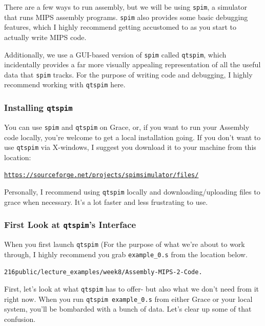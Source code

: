 \documentclass[english, 10pt]{article}
\begin{document}
There are a few ways to run assembly, but we will be using \texttt{spim}, a simulator that runs MIPS assembly programs. \texttt{spim} also provides some basic debugging features, which I highly recommend getting accustomed to as you start to actually write MIPS code.\newline

Additionally, we use a GUI-based version of \texttt{spim} called \texttt{qtspim}, which incidentally provides a far more visually appealing representation of all the useful data that \texttt{spim} tracks. For the purpose of writing code and debugging, I highly recommend working with \texttt{qtspim} here.\newline

\subsubsection{Installing \texttt{qtspim}}

You can use \texttt{spim} and \texttt{qtspim} on Grace, or, if you want to run your Assembly code locally, you're welcome to get a local installation going. If you don't want to use \texttt{qtspim} via X-windows, I suggest you download it to your machine from this location:\newline

\texttt{\href{https://sourceforge.net/projects/spimsimulator/files/}{https://sourceforge.net/projects/spimsimulator/files/}}\newline

Personally, I recommend using \texttt{qtspim} locally and downloading/uploading files to grace when necessary. It's a lot faster and less frustrating to use.\newline

\subsubsection{First Look at \texttt{qtspim}'s Interface}

When you first launch \texttt{qtspim} (For the purpose of what we're about to work through, I highly recommend you grab \texttt{example\_0.s} from the location below.\newline

\texttt{216public/lecture\_examples/week8/Assembly-MIPS-2-Code.}\newline

First, let's look at what \texttt{qtspim} has to offer- but also what we don't need from it right now. When you run \texttt{qtspim example\_0.s} from either Grace or your local system, you'll be bombarded with a bunch of data. Let's clear up some of that confusion.\newline
\end{document}
